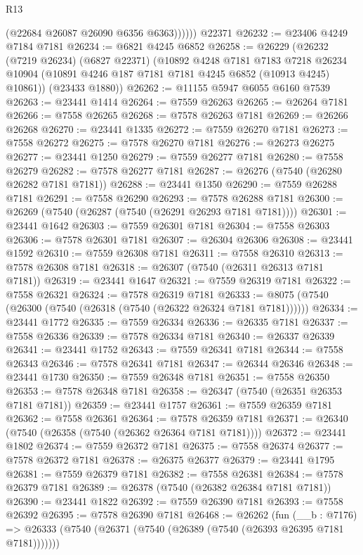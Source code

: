 \begin{lexlean}{R13}
\begin{coremodule}
              (@22684 @26087 @26090 @6356 @6363))))))
    @22371
@26232 := @23406 @4249 @7184 @7181
@26234 := @6821 @4245 @6852
@26258 := @26229
    (@26232
      (@7219 @26234)
      (@6827 @22371)
      (@10892
        @4248
        @7181
        @7183
        @7218
        @26234
        @10904
        (@10891 @4246 @187 @7181 @7181 @4245 @6852 (@10913 @4245) @10861))
      (@23433 @1880))
@26262 := @11155 @5947 @6055 @6160 @7539
@26263 := @23441 @1414
@26264 := @7559 @26263
@26265 := @26264 @7181
@26266 := @7558 @26265
@26268 := @7578 @26263 @7181
@26269 := @26266 @26268
@26270 := @23441 @1335
@26272 := @7559 @26270 @7181
@26273 := @7558 @26272
@26275 := @7578 @26270 @7181
@26276 := @26273 @26275
@26277 := @23441 @1250
@26279 := @7559 @26277 @7181
@26280 := @7558 @26279
@26282 := @7578 @26277 @7181
@26287 := @26276 (@7540 (@26280 @26282 @7181 @7181))
@26288 := @23441 @1350
@26290 := @7559 @26288 @7181
@26291 := @7558 @26290
@26293 := @7578 @26288 @7181
@26300 := @26269 (@7540 (@26287 (@7540 (@26291 @26293 @7181 @7181))))
@26301 := @23441 @1642
@26303 := @7559 @26301 @7181
@26304 := @7558 @26303
@26306 := @7578 @26301 @7181
@26307 := @26304 @26306
@26308 := @23441 @1592
@26310 := @7559 @26308 @7181
@26311 := @7558 @26310
@26313 := @7578 @26308 @7181
@26318 := @26307 (@7540 (@26311 @26313 @7181 @7181))
@26319 := @23441 @1647
@26321 := @7559 @26319 @7181
@26322 := @7558 @26321
@26324 := @7578 @26319 @7181
@26333 := @8075 (@7540 (@26300 (@7540 (@26318 (@7540 (@26322 @26324 @7181 @7181))))))
@26334 := @23441 @1772
@26335 := @7559 @26334
@26336 := @26335 @7181
@26337 := @7558 @26336
@26339 := @7578 @26334 @7181
@26340 := @26337 @26339
@26341 := @23441 @1752
@26343 := @7559 @26341 @7181
@26344 := @7558 @26343
@26346 := @7578 @26341 @7181
@26347 := @26344 @26346
@26348 := @23441 @1730
@26350 := @7559 @26348 @7181
@26351 := @7558 @26350
@26353 := @7578 @26348 @7181
@26358 := @26347 (@7540 (@26351 @26353 @7181 @7181))
@26359 := @23441 @1757
@26361 := @7559 @26359 @7181
@26362 := @7558 @26361
@26364 := @7578 @26359 @7181
@26371 := @26340 (@7540 (@26358 (@7540 (@26362 @26364 @7181 @7181))))
@26372 := @23441 @1802
@26374 := @7559 @26372 @7181
@26375 := @7558 @26374
@26377 := @7578 @26372 @7181
@26378 := @26375 @26377
@26379 := @23441 @1795
@26381 := @7559 @26379 @7181
@26382 := @7558 @26381
@26384 := @7578 @26379 @7181
@26389 := @26378 (@7540 (@26382 @26384 @7181 @7181))
@26390 := @23441 @1822
@26392 := @7559 @26390 @7181
@26393 := @7558 @26392
@26395 := @7578 @26390 @7181
@26468 := @26262
    (fun (__b : @7176) =>
    @26333 (@7540 (@26371 (@7540 (@26389 (@7540 (@26393 @26395 @7181 @7181)))))))

\end{coremodule}
\end{lexlean}

